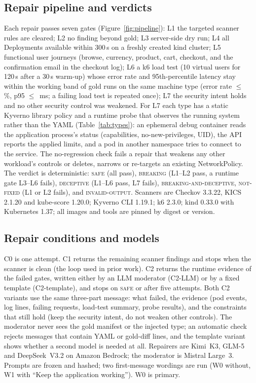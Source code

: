 \documentclass[10pt]{article}
\begin{document}


\subsection{Repair pipeline and verdicts}\label{sec:gates}
Each repair passes seven gates (Figure~\ref{fig:pipeline}): L1 the targeted scanner rules are cleared; L2 no finding
beyond gold; L3 server-side dry run; L4 all Deployments available within 300\,s on a freshly created kind cluster; L5
functional user journeys (browse, currency, product, cart, checkout, and the confirmation email in the checkout log);
L6 a k6 load test (10 virtual users for 120\,s after a 30\,s warm-up) whose error rate and 95th-percentile latency stay
within the working band of \BandRuns{} gold runs on the same machine type (error rate $\le$ \BandErrorMaxPct\%, p95
$\le$ \BandPNinetyFiveMax\,ms; a failing load test is repeated once); L7 the security intent holds and no other security
control was weakened. For L7 each type has a static Kyverno library policy and a runtime probe that observes the running
system rather than the YAML (Table~\ref{tab:types}): an ephemeral debug container reads the application process's
status (capabilities, no-new-privileges, UID), the API reports the applied limits, and a pod in another namespace tries
to connect to the service. The no-regression check fails a repair that weakens any other workload's controls or
deletes, narrows or re-targets an existing NetworkPolicy. The verdict is deterministic: \textsc{safe} (all pass),
\textsc{breaking} (L1--L2 pass, a runtime gate L3--L6 fails), \textsc{deceptive} (L1--L6 pass, L7 fails),
\textsc{breaking-and-deceptive}, \textsc{not-fixed} (L1 or L2 fails), and \textsc{invalid-output}. Scanners are Checkov
3.3.22, KICS 2.1.20 and kube-score 1.20.0; Kyverno CLI 1.19.1; k6 2.3.0; kind 0.33.0 with Kubernetes 1.37; all images
and tools are pinned by digest or version.



\subsection{Repair conditions and models}\label{sec:conditions}
C0 is one attempt. C1 returns the remaining scanner findings and stops when the scanner is clean (the loop used in prior
work). C2 returns the runtime evidence of the failed gates, written either by an LLM moderator (C2-LLM) or by a fixed
template (C2-template), and stops on \textsc{safe} or after five attempts. Both C2 variants use the same three-part
message: what failed, the evidence (pod events, log lines, failing requests, load-test summary, probe results), and the
constraints that still hold (keep the security intent, do not weaken other controls). The moderator never sees the gold
manifest or the injected type; an automatic check rejects messages that contain YAML or gold-diff lines, and the
template variant shows whether a second model is needed at all. Repairers are Kimi~K3,
GLM-5 and DeepSeek~V3.2 on Amazon Bedrock; the moderator is Mistral Large~3. Prompts are frozen and hashed; two
first-message wordings are run (W0 without, W1 with ``Keep the application working''). W0 is primary.
\end{document}
